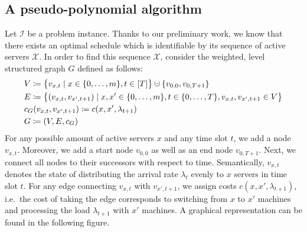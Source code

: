\documentclass[hidelinks]{article}
\theoremstyle{plain}
\theoremstyle{definition}
\theoremstyle{rem}
\newcommand{\mx}{\mathcal{X}}
\newcommand{\inp}{\mathcal{I}}
\newcommand{\costs}{c}
\newcommand{\fromto}[2]{\{#1,\ldots,#2\}}
\newcommand{\dotcup}{\mathbin{\mathaccent\cdot\cup}}
\begin{document}
\subsection{A pseudo-polynomial algorithm}\label{sec_opt_offline_pseudo_poly}
Let $\inp$ be a problem instance. Thanks to our preliminary work, we know that there exists an optimal schedule which is identifiable by its sequence of active servers $\mx$. In order to find this sequence $\mx$, consider the weighted, level structured graph $G$ defined as follows:
\begin{align*}
	&V\coloneqq\bigl\{v_{x,t}\mid x\in\fromto{0}{m},t\in[T]\bigr\}\dotcup\{v_{0,0},v_{0,T+1}\}\\
	&E\coloneqq\bigl\{(v_{x,t},v_{x',t+1})\mid x,x'\in\fromto{0}{m},t\in\fromto{0}{T},v_{x,t},v_{x',t+1}\in V\bigr\}\\
	&c_G(v_{x,t},v_{x',t+1})\coloneqq\costs(x,x',\lambda_{t+1})\\
	&G\coloneqq(V,E,c_G)
\end{align*}
For any possible amount of active servers $x$ and any time slot $t$, we add a node $v_{x,t}$. Moreover, we add a start node $v_{0,0}$ as well as an end node $v_{0,T+1}$. Next, we connect all nodes to their successors with respect to time. Semantically, $v_{x,t}$ denotes the state of distributing the arrival rate $\lambda_{t}$ evenly to $x$ servers in time slot $t$. For any edge connecting $v_{x,t}$ with $v_{x',t+1}$, we assign costs $\costs(x,x',\lambda_{t+1})$, i.e.\ the cost of taking the edge corresponds to switching from $x$ to $x'$ machines and processing the load $\lambda_{t+1}$ with $x'$ machines. A graphical representation can be found in the following figure.
\end{document}
